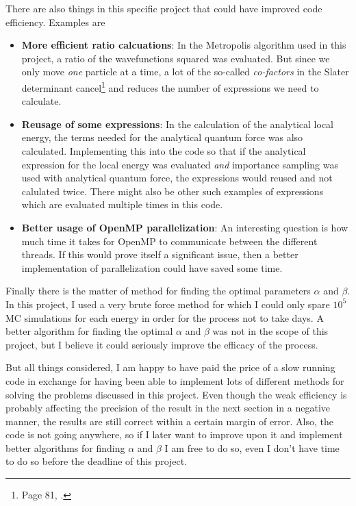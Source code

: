There are also things in this specific project that could have improved code efficiency. Examples are

\begin{itemize}
	\item \textbf{More efficient ratio calcuations}:
	In the Metropolis algorithm used in this project, a ratio of the wavefunctions squared was evaluated. 
	But since we only move \textit{one} particle at a time, a lot of the so-called \textit{co-factors} in the Slater determinant cancel\footnote{Page 81, \cite{master}.} and reduces the number of expressions we need to calculate. 
	\item \textbf{Reusage of some expressions}:
	In the calculation of the analytical local energy, the terms needed for the analytical quantum force was also calculated. Implementing this into the code so that if the analytical expression for the local energy was evaluated \textit{and} importance sampling was used with analytical quantum force, the expressions would reused and not calulated twice. 
	There might also be other such examples of expressions which are evaluated multiple times in this code.
	\item \textbf{Better usage of OpenMP parallelization}:
	An interesting question is how much time it takes for OpenMP to communicate between the different threads.
	If this would prove itself a significant issue, then a better implementation of parallelization could have saved some time. 
\end{itemize}

Finally there is the matter of method for finding the optimal parameters $\alpha$ and $\beta$. 
In this project, I used a very brute force method for which I could only spare $10^5$ MC simulations for each energy in order for the process not to take days. 
A better algorithm for finding the optimal $\alpha$ and $\beta$ was not in the scope of this project, but I believe it could seriously improve the efficacy of the process.

But all things considered, I am happy to have paid the price of a slow running code in exchange for having been able to implement lots of different methods for solving the problems discussed in this project. 
Even though the weak efficiency is probably affecting the precision of the result in the next section in a negative manner, the results are still correct within a certain margin of error.
Also, the code is not going anywhere, so if I later want to improve upon it and implement better algorithms for finding $\alpha$ and $\beta$ I am free to do so, even I don't have time to do so before the deadline of this project. 









